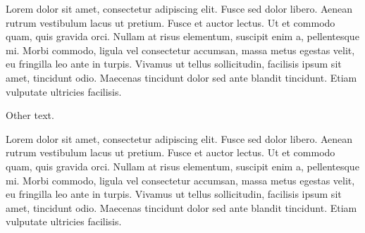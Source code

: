 \documentclass{article}
\begin{document}
\begin{minipage}[t]{0.95\linewidth}%
\beginnumbering
\pstart
{} Lorem dolor sit amet, consectetur adipiscing elit. 
 Fusce sed dolor libero. Aenean rutrum vestibulum lacus ut pretium. Fusce et auctor lectus. Ut et commodo quam, quis gravida orci. Nullam at risus elementum, suscipit enim a, pellentesque mi. 
 Morbi commodo, ligula vel consectetur accumsan, massa metus egestas velit, eu fringilla leo ante in turpis. Vivamus ut tellus sollicitudin, facilisis ipsum sit amet, tincidunt odio. Maecenas tincidunt dolor sed ante blandit tincidunt. Etiam vulputate ultricies facilisis.
\pend
\endnumbering
\end{minipage}%


Other text.

\begin{minipage}[t]{0.95\linewidth}%
\beginnumbering
\pstart
{} Lorem dolor sit amet, consectetur adipiscing elit. 
 Fusce sed dolor libero. Aenean rutrum vestibulum lacus ut pretium. Fusce et auctor lectus. Ut et commodo quam, quis gravida orci. Nullam at risus elementum, suscipit enim a, pellentesque mi. 
 Morbi commodo, ligula vel consectetur accumsan, massa metus egestas velit, eu fringilla leo ante in turpis. Vivamus ut tellus sollicitudin, facilisis ipsum sit amet, tincidunt odio. Maecenas tincidunt dolor sed ante blandit tincidunt. Etiam vulputate ultricies facilisis.
\pend
\endnumbering
\end{minipage}%
\makeatletter
\end{document}
